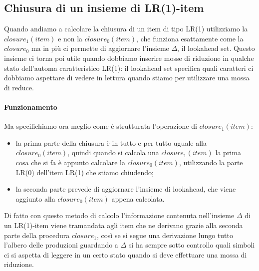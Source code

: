 \documentclass[class=book, crop=false, oneside, 12pt]{standalone}
\begin{document}
\subsection{Chiusura di un insieme di LR(1)-item}
Quando andiamo a calcolare la chiusura di un item di tipo LR(1) utilizziamo la \(closure_1(item)\) e non la \(closure_0(item)\), che funziona esattamente come la \(closure_0\) ma in più ci permette di aggiornare l'insieme \(\Delta\), il lookahead set. Questo insieme ci torna poi utile quando dobbiamo inserire mosse di riduzione in qualche stato dell'automa caratteristico LR(1): il lookahead set specifica quali caratteri ci dobbiamo aspettare di vedere in lettura quando stiamo per utilizzare una mossa di reduce.

\paragraph{Funzionamento}
Ma specifichiamo ora meglio come è strutturata l'operazione di \(closure_1(item)\):
\begin{itemize}
    \item la prima parte della chiusura è in tutto e per tutto uguale alla \(closure_0(item)\), quindi quando si calcola una \(closure_1(item)\) la prima cosa che si fa è appunto calcolare la \(closure_0(item)\), utilizzando la parte LR(0) dell'item LR(1) che stiamo chiudendo;
    \item la seconda parte prevede di aggiornare l'insieme di lookahead, che viene aggiunto alla \(closure_0(item)\) appena calcolata.  
\end{itemize}
Di fatto con questo metodo di calcolo l'informazione contenuta nell'insieme \(\Delta\) di un LR(1)-item viene tramandata agli item che ne derivano grazie alla seconda parte della procedura \(closure_1\), così se si segue una derivazione lungo tutto l'albero delle produzioni guardando a \(\Delta\) si ha sempre sotto controllo quali simboli ci si aspetta di leggere in un certo stato quando si deve effettuare una mossa di riduzione.
\end{document}
